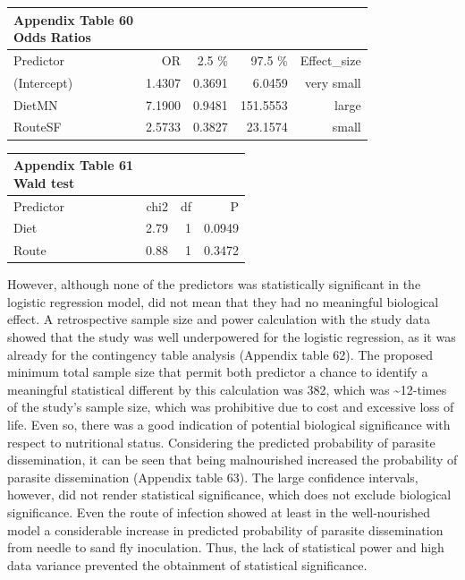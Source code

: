 \documentclass[
  12pt,
  letterpaper,
]{article}
\begin{document}
\begin{longtable}{l|rrrr}
\caption*{
{\large \textbf{Appendix Table 60}} \\ 
{\small \textbf{Odds Ratios}}
} \\ 
\toprule
\multicolumn{1}{l}{Predictor} & OR & 2.5 \% & 97.5 \% & Effect\_size \\ 
\midrule\addlinespace[2.5pt]
(Intercept) & 1.4307 & 0.3691 & 6.0459 & very small \\ 
DietMN & 7.1900 & 0.9481 & 151.5553 & large \\ 
RouteSF & 2.5733 & 0.3827 & 23.1574 & small \\ 
\bottomrule
\end{longtable}

\begin{longtable}{l|rrr}
\caption*{
{\large \textbf{Appendix Table 61}} \\ 
{\small \textbf{Wald test}}
} \\ 
\toprule
\multicolumn{1}{l}{Predictor} & chi2 & df & P \\ 
\midrule\addlinespace[2.5pt]
Diet & 2.79 & 1 & 0.0949 \\ 
Route & 0.88 & 1 & 0.3472 \\ 
\bottomrule
\end{longtable}

However, although none of the predictors was statistically significant in the logistic regression model, did not mean that they had no meaningful biological effect. A retrospective sample size and power calculation with the study data showed that the study was well underpowered for the logistic regression, as it was already for the contingency table analysis (Appendix table 62). The proposed minimum total sample size that permit both predictor a chance to identify a meaningful statistical different by this calculation was 382, which was \textasciitilde12-times of the study's sample size, which was prohibitive due to cost and excessive loss of life. Even so, there was a good indication of potential biological significance with respect to nutritional status. Considering the predicted probability of parasite dissemination, it can be seen that being malnourished increased the probability of parasite dissemination (Appendix table 63). The large confidence intervals, however, did not render statistical significance, which does not exclude biological significance. Even the route of infection showed at least in the well-nourished model a considerable increase in predicted probability of parasite dissemination from needle to sand fly inoculation. Thus, the lack of statistical power and high data variance prevented the obtainment of statistical significance.
\end{document}
